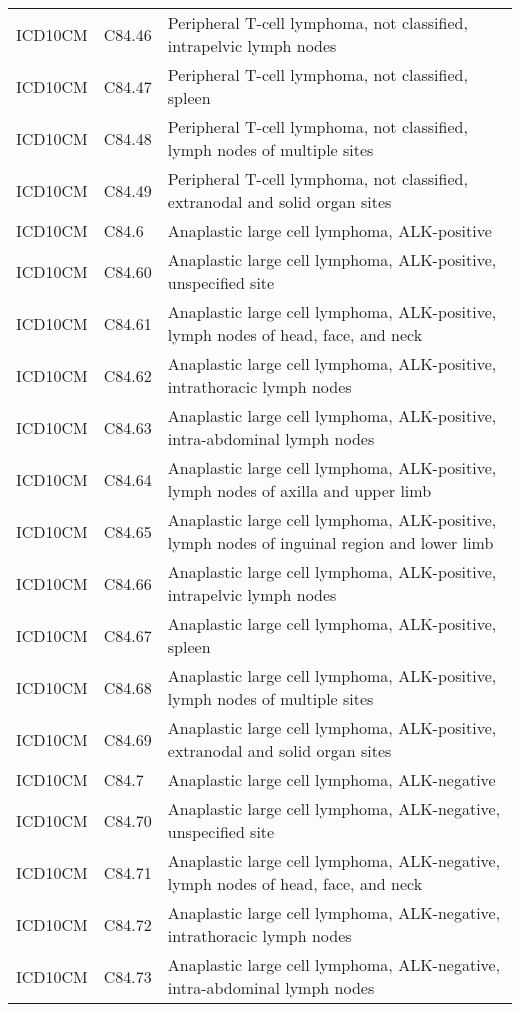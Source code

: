 \begin{longtable}{p{}p{}p{}}
  ICD10CM & C84.46 & Peripheral T-cell lymphoma, not classified, intrapelvic lymph nodes \\ 
  ICD10CM & C84.47 & Peripheral T-cell lymphoma, not classified, spleen \\ 
  ICD10CM & C84.48 & Peripheral T-cell lymphoma, not classified, lymph nodes of multiple sites \\ 
  ICD10CM & C84.49 & Peripheral T-cell lymphoma, not classified, extranodal and solid organ sites \\ 
  ICD10CM & C84.6 & Anaplastic large cell lymphoma, ALK-positive \\ 
  ICD10CM & C84.60 & Anaplastic large cell lymphoma, ALK-positive, unspecified site \\ 
  ICD10CM & C84.61 & Anaplastic large cell lymphoma, ALK-positive, lymph nodes of head, face, and neck \\ 
  ICD10CM & C84.62 & Anaplastic large cell lymphoma, ALK-positive, intrathoracic lymph nodes \\ 
  ICD10CM & C84.63 & Anaplastic large cell lymphoma, ALK-positive, intra-abdominal lymph nodes \\ 
  ICD10CM & C84.64 & Anaplastic large cell lymphoma, ALK-positive, lymph nodes of axilla and upper limb \\ 
  ICD10CM & C84.65 & Anaplastic large cell lymphoma, ALK-positive, lymph nodes of inguinal region and lower limb \\ 
  ICD10CM & C84.66 & Anaplastic large cell lymphoma, ALK-positive, intrapelvic lymph nodes \\ 
  ICD10CM & C84.67 & Anaplastic large cell lymphoma, ALK-positive, spleen \\ 
  ICD10CM & C84.68 & Anaplastic large cell lymphoma, ALK-positive, lymph nodes of multiple sites \\ 
  ICD10CM & C84.69 & Anaplastic large cell lymphoma, ALK-positive, extranodal and solid organ sites \\ 
  ICD10CM & C84.7 & Anaplastic large cell lymphoma, ALK-negative \\ 
  ICD10CM & C84.70 & Anaplastic large cell lymphoma, ALK-negative, unspecified site \\ 
  ICD10CM & C84.71 & Anaplastic large cell lymphoma, ALK-negative, lymph nodes of head, face, and neck \\ 
  ICD10CM & C84.72 & Anaplastic large cell lymphoma, ALK-negative, intrathoracic lymph nodes \\ 
  ICD10CM & C84.73 & Anaplastic large cell lymphoma, ALK-negative, intra-abdominal lymph nodes \\ 

\end{longtable}
